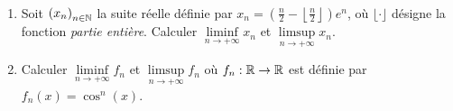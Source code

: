 \begin{td-exo}\, %
    \begin{enumerate}
        \item Soit \({(x_n)}_{n\in\mathbb{N}}\) 
        la suite réelle définie par \(x_n=\left(\frac{n}{2}-\left\lfloor\frac{n}{2}\right\rfloor\right)e^n\), 
        où \(\lfloor \cdot\rfloor\) désigne la fonction \emph{partie entière}. 
        Calculer \(\liminf\limits_{n\to+\infty} x_n\) et \(\limsup\limits_{n\to+\infty} x_n\).
        \item Calculer \(\liminf\limits_{n\to+\infty} f_n\) et \(\limsup\limits_{n\to+\infty} f_n\) 
        où \(f_n:\mathbb{R}\to\mathbb{R}\) est définie par \(f_n(x)=\cos^n(x)\).

    \end{enumerate}

    \begin{center}
        
    \end{center}
\end{td-exo}
